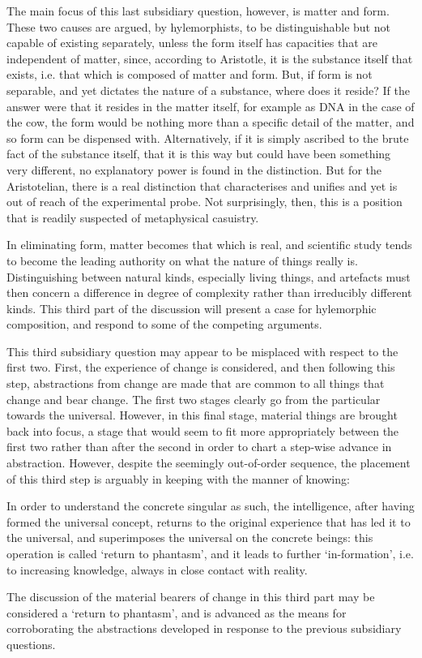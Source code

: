 The main focus of this last subsidiary question, however, is matter and form. These two causes are argued, by hylemorphists, to be distinguishable but not capable of existing separately, unless the form itself has capacities that are independent of matter, since, according to Aristotle, it is the substance itself that exists, i.e. that which is composed of matter and form. But, if form is not separable, and yet dictates the nature of a substance, where does it reside? If the answer were that it resides in the matter itself, for example as DNA in the case of the cow, the form would be nothing more than a specific detail of the matter, and so form can be dispensed with. Alternatively, if it is simply ascribed to the brute fact of the substance itself, that it is this way but could have been something very different, no explanatory power is found in the distinction. But for the Aristotelian, there is a real distinction that characterises and unifies and yet is out of reach of the experimental probe. Not surprisingly, then, this is a position that is readily suspected of metaphysical casuistry.

In eliminating form, matter becomes that which is real, and scientific study tends to become the leading authority on what the nature of things really is. Distinguishing between natural kinds, especially living things, and artefacts must then concern a difference in degree of complexity rather than irreducibly different kinds.
This third part of the discussion will present a case for hylemorphic composition, and respond to some of the competing arguments.

This third subsidiary question may appear to be misplaced with respect to the first two. First, the experience of change is considered, and then following this step, abstractions from change are made that are common to all things that change and bear change. The first two stages clearly go from the particular towards the universal. However, in this final stage, material things are brought back into focus, a stage that would seem to fit more appropriately between the first two rather than after the second in order to chart a step-wise advance in abstraction. However, despite the seemingly out-of-order sequence, the placement of this third step is arguably in keeping with the manner of knowing:
\begin{quoting}
  In order to understand the concrete singular as such, the intelligence, after having formed the universal concept, returns to the original experience that has led it to the universal, and superimposes the universal on the concrete beings: this operation is called `return to phantasm', and it leads to further `in-formation', i.e. to increasing knowledge, always in close contact with reality.
\parencite[][170]{de1981christian}
\end{quoting}
The discussion of the material bearers of change in this third part may be considered a `return to phantasm', and is advanced as the means for corroborating the abstractions developed in response to the previous subsidiary questions.
